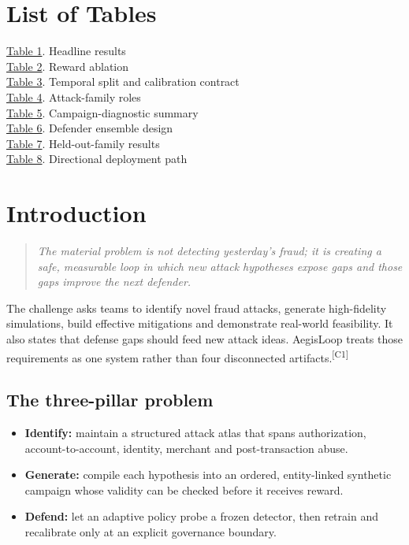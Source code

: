 \documentclass[11pt,a4paper,oneside]{article}
\newcommand{\competition}{\textsuperscript{\textcolor{EvidenceGray}{[C1]}}}
\newcommand{\tableref}[2]{\hyperlink{#1}{Table #2}}
\newcommand{\sectionlead}[1]{\begin{quote}\itshape #1\end{quote}}
\begin{document}
\section*{List of Tables}
\noindent\tableref{tab:headline}{1}. Headline results \dotfill \pageref{tab:headline}\\
\tableref{tab:ablation}{2}. Reward ablation \dotfill \pageref{tab:ablation}\\
\tableref{tab:split}{3}. Temporal split and calibration contract \dotfill \pageref{tab:split}\\
\tableref{tab:roles}{4}. Attack-family roles \dotfill \pageref{tab:roles}\\
\tableref{tab:fidelity}{5}. Campaign-diagnostic summary \dotfill \pageref{tab:fidelity}\\
\tableref{tab:defender}{6}. Defender ensemble design \dotfill \pageref{tab:defender}\\
\tableref{tab:efficacy}{7}. Held-out-family results \dotfill \pageref{tab:efficacy}\\
\tableref{tab:deployment}{8}. Directional deployment path \dotfill \pageref{tab:deployment}
\clearpage


\section{Introduction}
\sectionlead{The material problem is not detecting yesterday's fraud; it is creating a safe, measurable loop in which new attack hypotheses expose gaps and those gaps improve the next defender.}

The challenge asks teams to identify novel fraud attacks, generate high-fidelity simulations, build effective mitigations and demonstrate real-world feasibility. It also states that defense gaps should feed new attack ideas. AegisLoop treats those requirements as one system rather than four disconnected artifacts.\competition

\subsection{The three-pillar problem}
\begin{itemize}
  \item \textbf{Identify:} maintain a structured attack atlas that spans authorization, account-to-account, identity, merchant and post-transaction abuse.
  \item \textbf{Generate:} compile each hypothesis into an ordered, entity-linked synthetic campaign whose validity can be checked before it receives reward.
  \item \textbf{Defend:} let an adaptive policy probe a frozen detector, then retrain and recalibrate only at an explicit governance boundary.
\end{itemize}
\end{document}
